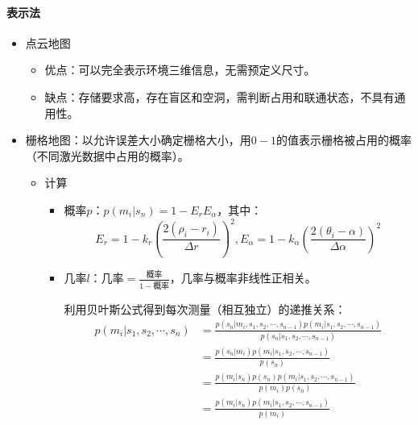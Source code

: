 \documentclass[
12pt, %
a4paper, 
oneside, %
headinclude,footinclude, %
]{scrartcl}
\begin{document}
\paragraph{表示法}
\begin{itemize}
\item 点云地图
\begin{itemize}
\item 优点：可以完全表示环境三维信息，无需预定义尺寸。
\item 缺点：存储要求高，存在盲区和空洞，需判断占用和联通状态，不具有通用性。
\end{itemize}
\item 栅格地图：以允许误差大小确定栅格大小，用$ 0 - 1 $的值表示栅格被占用的概率（不同激光数据中占用的概率）。
\begin{itemize}
\item 计算
\begin{itemize}
\item 概率$ p $：$ p(m_i|s_n) = 1 - E_r E_\alpha $，其中：
$$ E_r = 1 - k_r(\frac{2(\rho_i - r_i)}{\Delta r})^2, E_\alpha = 1 - k_\alpha(\frac{2(\theta_i - \alpha)}{\Delta\alpha})^2 $$
\item 几率$ l $：$ \text{几率} = \frac{\text{概率}}{1 - \text{概率}} $，几率与概率非线性正相关。

利用贝叶斯公式得到每次测量（相互独立）的递推关系：
\begin{align*}
p(m_i|s_1, s_2, \cdots, s_n)
& = \frac{p(s_n|m_i, s_1, s_2, \cdots, s_{n - 1})p(m_i|s_1, s_2, \cdots, s_{n - 1})}{p(s_n|s_1, s_2, \cdots, s_{n - 1})} \\
&= \frac{p(s_n|m_i)p(m_i|s_1, s_2, \cdots, s_{n - 1})}{p(s_n)} \\
&= \frac{p(m_i|s_n)p(s_n)p(m_i|s_1, s_2, \cdots, s_{n - 1})}{p(m_i)p(s_n)} \\
&= \frac{p(m_i|s_n)p(m_i|s_1, s_2, \cdots, s_{n - 1})}{p(m_i)}
\end{align*}


\end{itemize}
\end{itemize}
\end{itemize}
\end{document}
